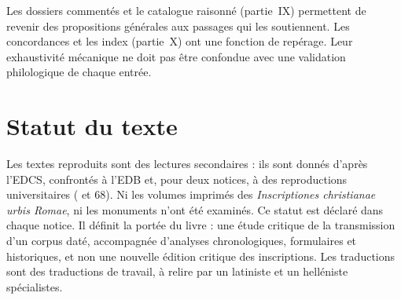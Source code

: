 Les dossiers commentés et le catalogue raisonné (partie~IX) permettent de revenir des propositions générales aux passages qui les soutiennent. Les concordances et les index (partie~X) ont une fonction de repérage. Leur exhaustivité mécanique ne doit pas être confondue avec une validation philologique de chaque entrée.

\section{Statut du texte}

Les textes reproduits sont des lectures secondaires : ils sont donnés d’après l’EDCS, confrontés à l’EDB et, pour deux notices, à des reproductions universitaires ( et 68). Ni les volumes imprimés des \emph{Inscriptiones christianae urbis Romae}, ni les monuments n’ont été examinés. Ce statut est déclaré dans chaque notice. Il définit la portée du livre : une étude critique de la transmission d’un corpus daté, accompagnée d’analyses chronologiques, formulaires et historiques, et non une nouvelle édition critique des inscriptions. Les traductions sont des traductions de travail, à relire par un latiniste et un helléniste spécialistes.
